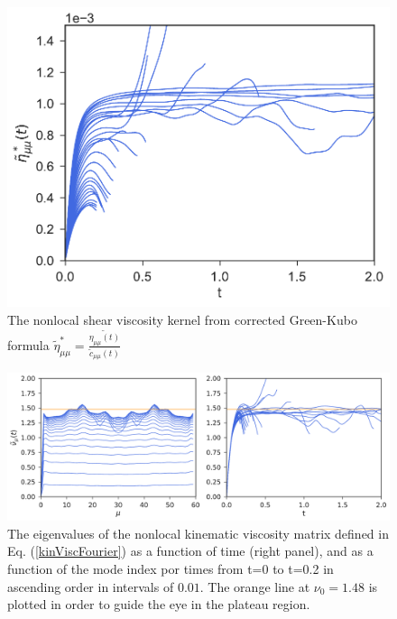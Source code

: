 \documentclass[b5paper,openright,11pt]{book}
\begin{document}
\begin{figure}[h!]
  \centering
\includegraphics[scale=0.41]{EtaStartFourier-PBC}
\caption[The nonlocal shear viscosity kernel for PBC system]{The nonlocal shear viscosity kernel from corrected Green-Kubo formula $\tilde{\eta}^*_{\mu\mu}=\frac{\tilde{\eta_{\mu\mu}(t)}}{\tilde{c}_{\mu\mu}(t)}$}
\label{fig:EtaStartFourier-PBC}
\end{figure}
\begin{figure}[h!]
  \centering
\includegraphics[width=\linewidth]{KinVisctFourier-PBC}
\caption[The eigenvalues of the nonlocal kinematic viscosity matrix for PBC system]{The eigenvalues of the nonlocal kinematic viscosity matrix defined in Eq. (\ref{kinViscFourier}) as a function of time (right panel), and as a function of the mode index por times from t=0 to t=0.2 in ascending order in intervals of $0.01$. The orange line at $\nu_0=1.48$ is plotted in order to guide the eye in the plateau region.}
\label{fig:KinVisctFourier-PBC}
\end{figure}
\end{document}
